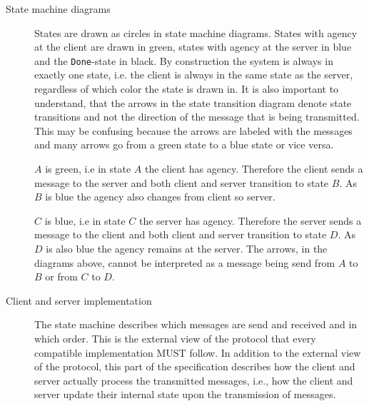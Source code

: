 \documentclass{report}
\newcommand{\wip}[1]{\color{magenta}{#1}\color{black}}
\newcommand{\state}[1]{\texttt{#1}}
\newcommand{\Done}{\state{Done}}
\theoremstyle{definition}{
  \newtheorem{lemma}{Lemma}[section] %
  \newtheorem{definition}[lemma]{Definition}
}
\theoremstyle{theorem}{
  \newtheorem{invariant}[lemma]{Invariant}
  \newtheorem{proofobligation}[lemma]{Proof Obligation}
}
\numberwithin{equation}{lemma}
\begin{document}
\begin{description}
\item [State machine diagrams]
      States are drawn as circles in state machine diagrams.
      States with agency at the client are drawn in green, states with agency at the server in blue and
      the \Done-state in black.
      By construction the system is always in exactly one state,
      i.e. the client is always in the same state as the server,
      regardless of which color the state is drawn in.
      It is also important to understand, that the arrows in the state transition diagram denote
      state transitions and not the direction of the message that is being transmitted.
      This may be confusing because the arrows are labeled with the messages and
      many arrows go from a green state to a blue state or vice versa.

      \wip{TODO: find a latex style to mark tricky sections that must be read carefully.}


      $A$ is green, i.e in state $A$ the client has agency.
      Therefore the client sends a message to the server and
      both client and server transition to state $B$.
      As $B$ is blue the agency also changes from client so server.


      $C$ is blue, i.e in state $C$ the server has agency.
      Therefore the server sends a message to the client and
      both client and server transition to state $D$.
      As $D$ is also blue the agency remains at the server.
      The arrows, in the diagrams above,
      cannot be interpreted as a message being send from $A$ to $B$ or from $C$ to $D$.

\item[Client and server implementation]
  The state machine describes which messages are send and received and in which order.
  This is the external view of the protocol that every compatible implementation MUST follow.
  In addition to the external view of the protocol, this part of the specification describes
  how the client and server actually process the transmitted messages,
  i.e., how the client and server update their internal state upon the transmission of messages.
\end{description}
\end{document}
